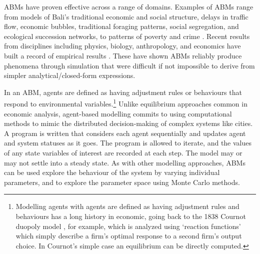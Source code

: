 ABMs have proven effective across a range of domains. Examples of ABMs range from models of Bali's traditional economic and social structure, delays in traffic flow, economic bubbles, 
traditional foraging patterns, %
social segregation, and ecological succession networks, to patterns of poverty and crime \cite{open_agent_based_modeling_consortium_comses_????}. %
Recent results from disciplines including physics, biology, anthropology, and economics have built a record of empirical results \cite{parkerMultiAgentSystemsSimulation2003, parker_multi-agent_2003, helbing_social_2011-1}. 
These have shown ABMs reliably produce phenomena through simulation that were difficult if not impossible to derive from simpler analytical/closed-form expressions. 


In an \gls{ABM}, agents are defined as having adjustment rules or behaviours that respond to environmental variables.\footnote{Modelling agents with agents are defined as having adjustment rules and behaviours has a long history in economic, going back to the 1838 Cournot duopoly model \cite{cournotRecherchesPrincipesMathematiques1838}, for example, which is analyzed using `reaction functions' which simply describe a firm's optimal response to a second firm's output choice. In Cournot's simple case an equilibrium can be directly computed.} 
Unlike equilibrium approaches common in economic analysis, agent-based modelling commits to using computational methods to mimic the distributed decision-making of complex systems like cities. A program is written that considers each agent sequentially and updates agent and system statuses as it goes. The program is allowed to iterate, and the values of any state variables of interest are recorded at each step. The model may or may not settle into a steady state. As with other modelling approaches, ABMs can be used explore the behaviour of the system by varying individual parameters, and to explore the parameter space using Monte Carlo methods.


